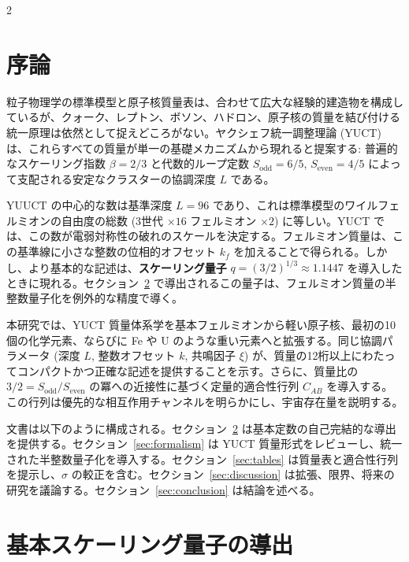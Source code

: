 \documentclass[11pt,a4paper]{article}
\theoremstyle{remark}
\begin{document}
	\begin{multicols}{2}
		
		\section{序論}
		
		粒子物理学の標準模型と原子核質量表は、合わせて広大な経験的建造物を構成しているが、クォーク、レプトン、ボソン、ハドロン、原子核の質量を結び付ける統一原理は依然として捉えどころがない。ヤクシェフ統一調整理論 (YUCT) は、これらすべての質量が単一の基礎メカニズムから現れると提案する: 普遍的なスケーリング指数 \(\beta = 2/3\) と代数的ループ定数 \(S_{\mathrm{odd}}=6/5\), \(S_{\mathrm{even}}=4/5\) によって支配される安定なクラスターの協調深度 \(L\) である。
		
		YUUCT の中心的な数は基準深度 \(L = 96\) であり、これは標準模型のワイルフェルミオンの自由度の総数 (3世代 $\times 16$ フェルミオン $\times 2$) に等しい。YUCT では、この数が電弱対称性の破れのスケールを決定する。フェルミオン質量は、この基準線に小さな整数の位相的オフセット \(k_f\) を加えることで得られる。しかし、より基本的な記述は、\textbf{スケーリング量子} \(q = (3/2)^{1/3} \approx 1.1447\) を導入したときに現れる。セクション~\ref{sec:derivation} で導出されるこの量子は、フェルミオン質量の半整数量子化を例外的な精度で導く。
		
		本研究では、YUCT 質量体系学を基本フェルミオンから軽い原子核、最初の10個の化学元素、ならびに Fe や U のような重い元素へと拡張する。同じ協調パラメータ (深度 \(L\), 整数オフセット \(k\), 共鳴因子 \(\xi\)) が、質量の12桁以上にわたってコンパクトかつ正確な記述を提供することを示す。さらに、質量比の \(3/2 = S_{\mathrm{odd}}/S_{\mathrm{even}}\) の冪への近接性に基づく定量的適合性行列 \(C_{AB}\) を導入する。この行列は優先的な相互作用チャンネルを明らかにし、宇宙存在量を説明する。
		
		文書は以下のように構成される。セクション~\ref{sec:derivation} は基本定数の自己完結的な導出を提供する。セクション~\ref{sec:formalism} は YUCT 質量形式をレビューし、統一された半整数量子化を導入する。セクション~\ref{sec:tables} は質量表と適合性行列を提示し、\(\sigma\) の較正を含む。セクション~\ref{sec:discussion} は拡張、限界、将来の研究を議論する。セクション~\ref{sec:conclusion} は結論を述べる。
		
		\section{基本スケーリング量子の導出}
		\label{sec:derivation}
		

\end{multicols}
\end{document}
